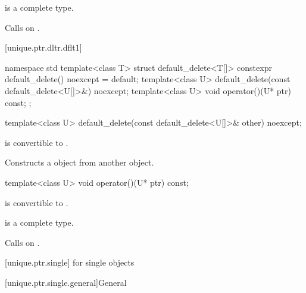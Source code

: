 \begin{itemdescr}
\pnum
\mandates
{} is a complete type.

\pnum
\effects
Calls  on .
\end{itemdescr}

[unique.ptr.dltr.dflt1]{}

\begin{codeblock}
namespace std {
  template<class T> struct default_delete<T[]> {
    constexpr default_delete() noexcept = default;
    template<class U> default_delete(const default_delete<U[]>&) noexcept;
    template<class U> void operator()(U* ptr) const;
  };
}
\end{codeblock}

\begin{itemdecl}
template<class U> default_delete(const default_delete<U[]>& other) noexcept;
\end{itemdecl}

\begin{itemdescr}
\pnum
\constraints
{} is convertible to .

\pnum
\effects
Constructs a  object from another  object.
\end{itemdescr}

%
\begin{itemdecl}
template<class U> void operator()(U* ptr) const;
\end{itemdecl}

\begin{itemdescr}
\pnum
\constraints
{} is convertible to .

\pnum
\mandates
{} is a complete type.

\pnum
\effects
Calls  on .
\end{itemdescr}

[unique.ptr.single]{ for single objects}

[unique.ptr.single.general]{General}

